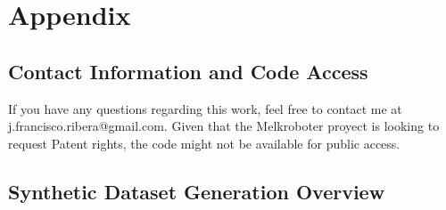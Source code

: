 \chapter{Appendix}\label{sec:chapAppendix}

\section{Contact Information and Code Access}
If you have any questions regarding this work, feel free to contact me at j.francisco.ribera@gmail.com. Given that the Melkroboter proyect is looking to request Patent rights, the code might not be available for public access.

\newpage
\section{Synthetic Dataset Generation Overview}
\label{appendix:ndds}

